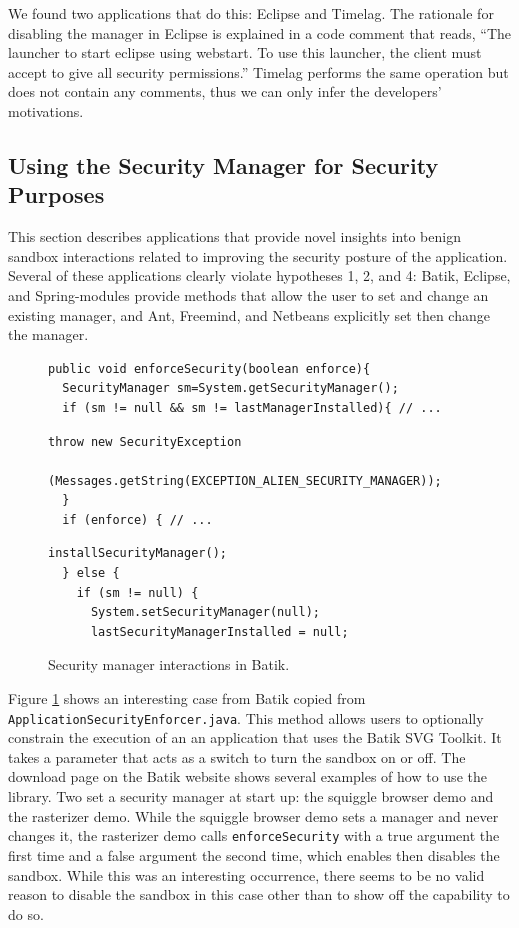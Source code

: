 \documentclass{sig-alternate}
\begin{document}
We found two applications that do this: Eclipse and
Timelag. The rationale for disabling the manager in Eclipse is explained in a
code comment that reads, ``The launcher to start eclipse using webstart. To use
this launcher, the client must accept to give all security permissions.'' Timelag
performs the same operation but does not contain any comments, thus we can only
infer the developers' motivations. 

\subsection{Using the Security Manager for Security Purposes}
\label{sub:Using-the-Security}

This section describes applications that provide novel insights into benign sandbox interactions related to improving the security
posture of the application. Several of these applications clearly violate hypotheses 1, 2, and 4: Batik, Eclipse, and Spring-modules provide
methods that allow the user to set and change an existing manager,
and Ant, Freemind, and Netbeans explicitly set then change the manager.

\begin{figure}
\begin{lstlisting}[firstnumber=156]
public void enforceSecurity(boolean enforce){ 
  SecurityManager sm=System.getSecurityManager();
  if (sm != null && sm != lastManagerInstalled){ // ...
\end{lstlisting}
\vspace{-0.3cm}
\begin{lstlisting}[firstnumber=163]
   throw new SecurityException
     (Messages.getString(EXCEPTION_ALIEN_SECURITY_MANAGER));   
  }                  
  if (enforce) { // ...
\end{lstlisting}
\vspace{-0.3cm}
\begin{lstlisting}[firstnumber=173]
    installSecurityManager();         
  } else {             
    if (sm != null) {                 
      System.setSecurityManager(null);
      lastSecurityManagerInstalled = null;             
\end{lstlisting}
\caption{Security manager interactions \label{fig:Batik-snippet} in
  Batik.}
\end{figure}


Figure \ref{fig:Batik-snippet} shows an interesting case from Batik
copied from \texttt{ApplicationSecurityEnforcer.java}. This method
allows users to optionally constrain the execution of an an application
that uses the Batik SVG Toolkit. It takes a parameter that acts as
a switch to turn the sandbox on or off. The download page on the Batik
website shows several examples of how to use the library. Two set
a security manager at start up: the squiggle browser demo and the
rasterizer demo. While the squiggle browser demo sets a manager and
never changes it, the rasterizer demo calls \texttt{enforceSecurity}
with a true argument the first time and a false argument the second
time, which enables then disables the sandbox. While this was an interesting
occurrence, there seems to be no valid reason to disable the sandbox
in this case other than to show off the capability to do so.
\end{document}
